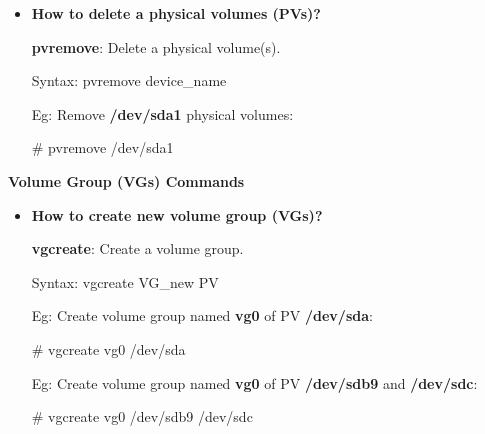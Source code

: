 \begin{flushleft}
\begin{itemize}
		\bigskip
		\bigskip
		\item  \textbf{How to delete a physical volumes (PVs)?}
		
		\textbf{pvremove}: Delete a physical volume(s).
		\begin{tcolorbox}[breakable,notitle,boxrule=-0pt,colback=pink,colframe=pink]
			\color{black}
			\font=9pt
			Syntax: pvremove device\_name
			\font=4pt
		\end{tcolorbox}
		
		Eg: Remove \textbf{/dev/sda1} physical volumes:
		\begin{tcolorbox}[breakable,notitle,boxrule=-0pt,colback=black,colframe=black]
			\color{green}
			\font=9pt
			\# pvremove /dev/sda1
			\font=4pt
		\end{tcolorbox}
		
	\end{itemize}
	
	\newpage
	
	\textbf{Volume Group (VGs) Commands}
	
	\begin{itemize}
		\item \textbf{How to create new volume group (VGs)?}
			
			\textbf{vgcreate}: Create a volume group.
			\begin{tcolorbox}[breakable,notitle,boxrule=-0pt,colback=pink,colframe=pink]
				\color{black}
				\font=9pt
				Syntax: vgcreate VG\_new PV
				\font=4pt
			\end{tcolorbox}
			
					
			Eg: Create volume group named \textbf{vg0} of PV \textbf{/dev/sda}:
			\begin{tcolorbox}[breakable,notitle,boxrule=-0pt,colback=black,colframe=black]
				\color{green}
				\font=9pt
				\# vgcreate vg0 /dev/sda
				\font=4pt
			\end{tcolorbox}
			
			Eg: Create volume group named \textbf{vg0} of PV \textbf{/dev/sdb9} and \textbf{/dev/sdc}:
			\begin{tcolorbox}[breakable,notitle,boxrule=-0pt,colback=black,colframe=black]
				\color{green}
				\font=9pt
				\# vgcreate vg0 /dev/sdb9 /dev/sdc
				\font=4pt
			\end{tcolorbox}
			
	\end{itemize}


\end{flushleft}
